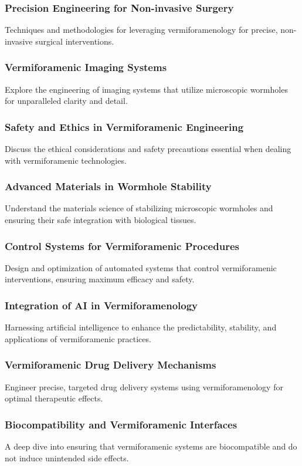 \subsubsection{Precision Engineering for Non-invasive Surgery}
Techniques and methodologies for leveraging vermiforamenology for precise, non-invasive surgical interventions.
\subsubsection{Vermiforamenic Imaging Systems}
Explore the engineering of imaging systems that utilize microscopic wormholes for unparalleled clarity and detail.
\subsubsection{Safety and Ethics in Vermiforamenic Engineering}
Discuss the ethical considerations and safety precautions essential when dealing with vermiforamenic technologies.
\subsubsection{Advanced Materials in Wormhole Stability}
Understand the materials science of stabilizing microscopic wormholes and ensuring their safe integration with biological tissues.
\subsubsection{Control Systems for Vermiforamenic Procedures}
Design and optimization of automated systems that control vermiforamenic interventions, ensuring maximum efficacy and safety.
\subsubsection{Integration of AI in Vermiforamenology}
Harnessing artificial intelligence to enhance the predictability, stability, and applications of vermiforamenic practices.
\subsubsection{Vermiforamenic Drug Delivery Mechanisms}
Engineer precise, targeted drug delivery systems using vermiforamenology for optimal therapeutic effects.
\subsubsection{Biocompatibility and Vermiforamenic Interfaces}
A deep dive into ensuring that vermiforamenic systems are biocompatible and do not induce unintended side effects.
